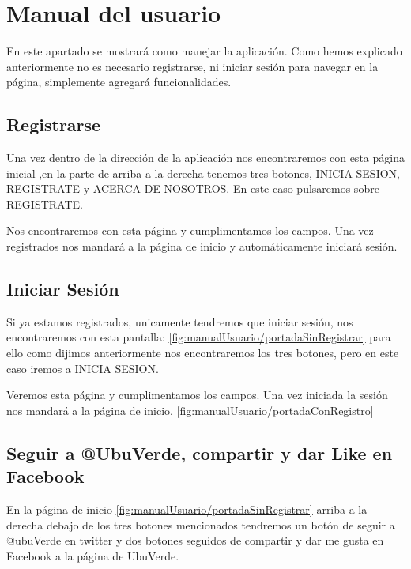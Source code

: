 \section{Manual del usuario}

En este apartado se mostrará como manejar la aplicación. Como hemos explicado anteriormente no es necesario registrarse, ni iniciar sesión para navegar en la página, simplemente agregará funcionalidades. 

\subsection{Registrarse}

Una vez dentro de la dirección de la aplicación nos encontraremos con esta página inicial ,en la parte de arriba a la derecha tenemos tres botones, INICIA SESION, REGISTRATE y ACERCA DE NOSOTROS. En este caso pulsaremos sobre REGISTRATE.

Nos encontraremos con esta página  y cumplimentamos los campos. Una vez registrados nos mandará a la página de inicio y automáticamente iniciará sesión. 

\subsection{Iniciar Sesión}

Si ya estamos registrados, unicamente tendremos que iniciar sesión, nos encontraremos con esta pantalla: \ref{fig:manualUsuario/portadaSinRegistrar} para ello como dijimos anteriormente nos encontraremos los tres botones, pero en este caso iremos a INICIA SESION.

Veremos esta página  y cumplimentamos los campos. Una vez iniciada la sesión nos mandará a la página de inicio. \ref{fig:manualUsuario/portadaConRegistro}

\subsection{Seguir a @UbuVerde, compartir y dar Like en Facebook}

En la página de inicio \ref{fig:manualUsuario/portadaSinRegistrar} arriba a la derecha debajo de los tres botones mencionados tendremos un botón de seguir a @ubuVerde en twitter y dos botones seguidos de compartir y dar me gusta en Facebook a la página de UbuVerde.

